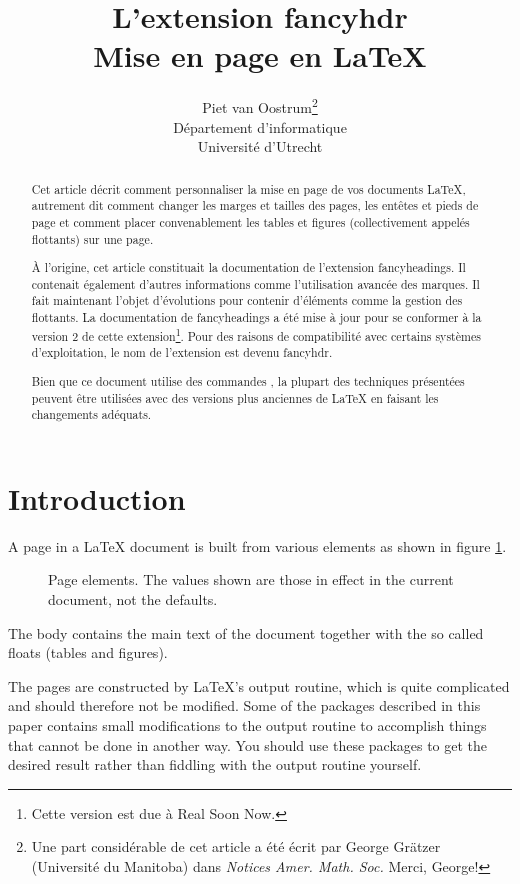 \documentclass[a4paper]{article}
\title{L'extension \textsf{fancyhdr}\\Mise en page en \LaTeX}
\author{Piet van Oostrum\thanks{Une part considérable de cet article a été 
    écrit par George
    Gr\"atzer (Université du Manitoba) dans \emph{Notices Amer. Math. Soc.}
    Merci, George!}\\
  Département d'informatique\\
  Université d'Utrecht}
\begin{document}
\maketitle
\begin{abstract}
  Cet article décrit comment personnaliser la mise en page de vos documents
  \LaTeX{}, autrement dit comment changer les marges et tailles des pages,
  les entêtes et pieds de page et comment placer convenablement les tables
  et figures (collectivement appelés flottants) sur une page.

  À l'origine, cet article constituait la documentation de l'extension
  \textsf{fancyheadings}. Il contenait également d'autres informations comme 
  l'utilisation avancée des marques. Il fait maintenant l'objet d'évolutions
  pour contenir d'éléments comme la gestion des flottants. La documentation de
  \textsf{fancyheadings} a été mise à jour pour se conformer à la version 2 de
  cette extension\footnote{Cette version est due à Real Soon Now.}. Pour des 
  raisons de compatibilité avec certains systèmes d'exploitation, le nom de 
  l'extension est devenu \textsf{fancyhdr}.

  Bien que ce document utilise des commandes \LaTeXe{}, la plupart des 
  techniques présentées peuvent être utilisées avec des versions plus anciennes
  de \LaTeX{} en faisant les changements adéquats.
\end{abstract}
\tableofcontents


\section{Introduction}
\label{sec:intro}

\tradini
A page in a \LaTeX{} document is built from various elements as shown in
figure \ref{fig:layout}. 
\begin{figure}[htbp]
  \begin{center}
    \leavevmode
    \layout
    \vspace{3cm}
    \caption{Page elements. The values shown are those in effect in the current document, not the defaults.}
    \label{fig:layout}
  \end{center}
\end{figure}
\thispagestyle{plain}
The body contains the main text of the document
together with the so called floats (tables and figures). 

The pages are constructed by \LaTeX's output routine, which is quite
complicated and should therefore not be modified. Some of the packages
described in this paper contains small modifications to the output routine
to accomplish things that cannot be done in another way. You should use
these packages to get the desired result rather than fiddling with the
output routine yourself.
\end{document}
